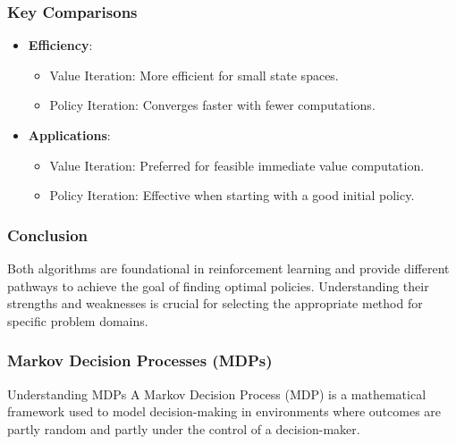 \documentclass[aspectratio=169]{beamer}
\begin{document}
\begin{frame}[fragile]
    \frametitle{Key Comparisons}
    \begin{itemize}
        \item \textbf{Efficiency}:
            \begin{itemize}
                \item Value Iteration: More efficient for small state spaces.
                \item Policy Iteration: Converges faster with fewer computations.
            \end{itemize}
        \item \textbf{Applications}:
            \begin{itemize}
                \item Value Iteration: Preferred for feasible immediate value computation.
                \item Policy Iteration: Effective when starting with a good initial policy.
            \end{itemize}
    \end{itemize}
\end{frame}

\begin{frame}[fragile]
    \frametitle{Conclusion}
    Both algorithms are foundational in reinforcement learning and provide different pathways to achieve the goal of finding optimal policies. Understanding their strengths and weaknesses is crucial for selecting the appropriate method for specific problem domains.
\end{frame}

\begin{frame}[fragile]
    \frametitle{Markov Decision Processes (MDPs)}
    \begin{block}{Understanding MDPs}
        A Markov Decision Process (MDP) is a mathematical framework used to model decision-making in environments where outcomes are partly random and partly under the control of a decision-maker.
    \end{block}
\end{frame}
\end{document}
